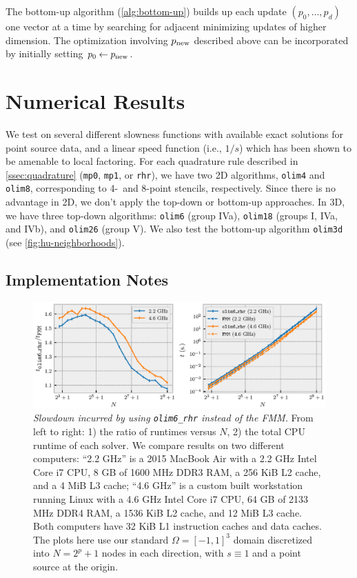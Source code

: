 \documentclass{article}
\begin{document}
The bottom-up algorithm (\cref{alg:bottom-up}) builds up each update
$(p_0, \hdots, p_d)$ one vector at a time by searching for adjacent
minimizing updates of higher dimension. The optimization involving
$p_{\operatorname{new}}$ described above can be incorporated by initially setting
$p_0 \gets p_{\operatorname{new}}$.

\section{Numerical Results}\label{sec:numerical-results} We test on several different
slowness functions with available exact solutions for point source
data, and a linear speed function (i.e., $1/s$) which has been shown
to be amenable to local factoring. For each quadrature rule described
in \cref{ssec:quadrature} (\texttt{mp0}, \texttt{mp1}, or
\texttt{rhr}), we have two 2D algorithms, \texttt{olim4} and
\texttt{olim8}, corresponding to 4-\ and 8-point stencils,
respectively. Since there is no advantage in 2D, we don't apply the
top-down or bottom-up approaches. In 3D, we have three top-down
algorithms: \texttt{olim6} (group IVa), \texttt{olim18} (groups I,
IVa, and IVb), and \texttt{olim26} (group V). We also test the
bottom-up algorithm \texttt{olim3d} (see \cref{fig:hu-neighborhoods}).

\subsection{Implementation Notes}\label{ssec:impl-notes}

\begin{figure}
  \centering \includegraphics[width=\linewidth]{speed-comparison.eps}%
  \caption{\emph{Slowdown incurred by using \texttt{olim6\_rhr}
      instead of the FMM.} From left to right: 1) the ratio of
    runtimes versus $N$, 2) the total CPU runtime of each solver. We
    compare results on two different computers: ``2.2 GHz'' is a 2015
    MacBook Air with a 2.2 GHz Intel Core i7 CPU, 8 GB of 1600 MHz
    DDR3 RAM, a 256 KiB L2 cache, and a 4 MiB L3 cache; ``4.6 GHz'' is
    a custom built workstation running Linux with a 4.6 GHz Intel Core
    i7 CPU, 64 GB of 2133 MHz DDR4 RAM, a 1536 KiB L2 cache, and 12
    MiB L3 cache. Both computers have 32 KiB L1 instruction caches and
    data caches. The plots here use our standard $\Omega = [-1, 1]^3$
    domain discretized into $N = 2^p + 1$ nodes in each direction,
    with $s \equiv 1$ and a point source at the
    origin.}\label{fig:speed-comparison}
\end{figure}
\end{document}

